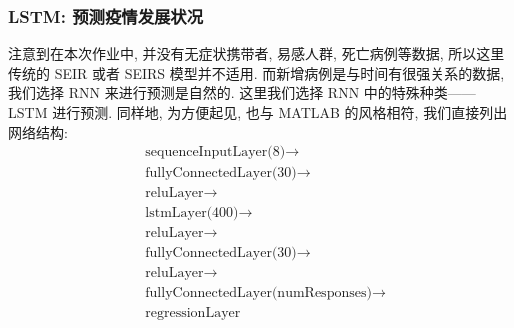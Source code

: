 \documentclass[UTF8]{ctexart}
\begin{document}
	\subsubsection*{LSTM: 预测疫情发展状况}
    注意到在本次作业中, 并没有无症状携带者, 易感人群, 死亡病例等数据, 所以这里传统的 SEIR 或者 SEIRS 模型并不适用. 而新增病例是与时间有很强关系的数据, 我们选择 RNN 来进行预测是自然的. 这里我们选择 RNN 中的特殊种类——LSTM 进行预测. 同样地, 为方便起见, 也与 MATLAB 的风格相符, 我们直接列出网络结构:
	\begin{align*}
		&\text{sequenceInputLayer(8)} \rightarrow \\
    	&\text{fullyConnectedLayer(30)} \rightarrow \\
    	&\text{reluLayer} \rightarrow \\
    	&\text{lstmLayer(400)} \rightarrow \\
    	&\text{reluLayer} \rightarrow \\
    	&\text{fullyConnectedLayer(30)} \rightarrow \\
    	&\text{reluLayer} \rightarrow \\
    	&\text{fullyConnectedLayer(numResponses)} \rightarrow \\
    	&\text{regressionLayer}
	\end{align*}
\end{document}
